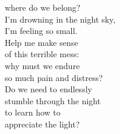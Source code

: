 \begin{flushleft}
\hspace{0.9cm}where do we belong?\\
\hspace{0.9cm}I'm drowning in the night sky,\\
\hspace{0.9cm}I'm feeling so small.\\
\hop
\hspace{0.9cm}Help me make sense \\
\hspace{0.9cm}of this terrible mess:\\
\hspace{0.9cm}why must we endure\\
\hspace{0.9cm}so much pain and distress?\\
\hspace{0.9cm}Do we need to endlessly\\
\hspace{0.9cm}stumble through the night\\
\hspace{0.9cm}to learn how to\\
\hspace{0.9cm}appreciate the light?\\
\end{flushleft}
\newpage